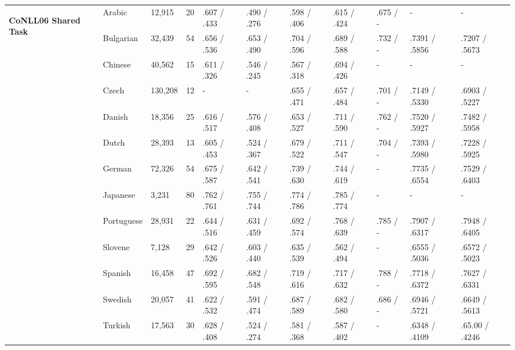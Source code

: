 \begin{landscape}
\begin{table}[ht]
\begin{tabular}{|l|l|l|l|p{2cm}|p{2cm}|p{2cm}|p{2cm}|p{2cm}|p{2cm}|p{2cm}|}
        \hline %
        \multirow{13}{*}{\begin{sideways}\textbf{CoNLL06 Shared Task}\end{sideways}}& 
        Arabic       & 12,915  & 20   & .607 / .433   & .490 / .276   & .598 / .406   & .615 / .424   & .675 / -    & -               & -  \\
        & Bulgarian  & 32,439  & 54   & .656 / .536   & .653 / .490   & .704 / .596   & .689 / .588   & .732 / -    & .7391 / .5856     & .7207 / .5673 \\
        & Chinese    & 40,562  & 15   & .611 / .326   & .546 / .245   & .567 / .318   & .694 / .426   & -           & -               & -           \\
        & Czech      & 130,208 & 12   & -             & -            & .655 / .471   & .657 / .484    & .701 / -    & .7149 / .5330     & .6903 / .5227 \\
        & Danish     & 18,356  & 25   & .616 / .517   & .576 / .408   & .653 / .527   & .711 / .590   & .762 / -    & .7520 / .5927     & .7482 / .5958 \\
        & Dutch      & 28,393  & 13   & .605 / .453   & .524 / .367   & .679 / .522   & .711 / .547   & .704 / -    & .7393 / .5980     & .7228 / .5925 \\
        & German     & 72,326  & 54   & .675 / .587   & .642 / .541   & .739 / .630   & .744 / .619   & -           & .7735 / .6554     & .7529 / .6403 \\
        & Japanese   & 3,231   & 80   & .762 / .761   & .755 / .744   & .774 / .786   & .785 / .774   & -           & -               & -           \\
        & Portuguese & 28,931  & 22   & .644 / .516   & .631 / .459   & .692 / .574   & .768 / .639   & .785 / -    & .7907 / .6317     & .7948 / .6405 \\
        & Slovene    & 7,128   & 29   & .642 / .526   & .603 / .440   & .635 / .539   & .562 / .494   & -           & .6555 / .5036     & .6572 / .5023 \\
        & Spanish    & 16,458  & 47   & .692 / .595   & .682 / .548   & .719 / .616   & .717 / .632   & .788 / -    & .7718 / .6372     & .7627 / .6331 \\
        & Swedish    & 20,057  & 41   & .622 / .532   & .591 / .474   & .687 / .589   & .682 / .580   & .686 / -    & .6946 / .5721     & .6649 / .5613 \\
        & Turkish    & 17,563  & 30   & .628 / .408   & .524 / .274   & .581 / .368   & .587 / .402   & -           & .6348 / .4109    & .65.00 / .4246 \\ \hline %

\end{tabular}
\end{table}
\end{landscape}
